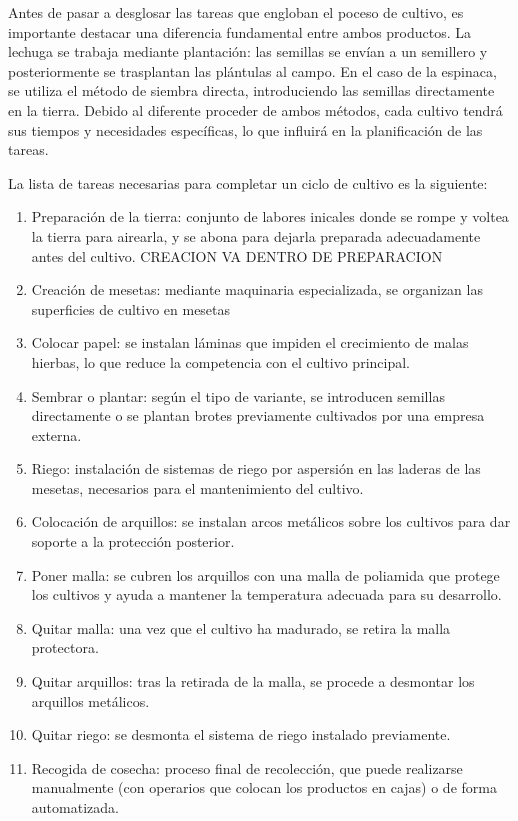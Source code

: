 Antes de pasar a desglosar las tareas que engloban el poceso de cultivo, es importante destacar una diferencia fundamental entre ambos productos.
La lechuga se trabaja mediante plantación: las semillas se envían a un semillero y posteriormente se trasplantan las plántulas al campo. 
En el caso de la espinaca, se utiliza el método de siembra directa, introduciendo las semillas directamente en la tierra.
Debido al diferente proceder de ambos métodos, cada cultivo tendrá sus tiempos y necesidades específicas, lo que influirá en la planificación de las tareas.

La lista de tareas necesarias para completar un ciclo de cultivo es la siguiente:
\begin{enumerate}
    \item Preparación de la tierra: conjunto de labores inicales donde se rompe y voltea la tierra para airearla, y se abona para dejarla preparada adecuadamente antes del cultivo.
    CREACION VA DENTRO DE PREPARACION
    \item Creación de mesetas: mediante maquinaria especializada, se organizan las superficies de cultivo en mesetas 
    \item Colocar papel: se instalan láminas que impiden el crecimiento de malas hierbas, lo que reduce la competencia con el cultivo principal.
    \item Sembrar o plantar: según el tipo de variante, se introducen semillas directamente o se plantan brotes previamente cultivados por una empresa externa.
    \item Riego: instalación de sistemas de riego por aspersión en las laderas de las mesetas, necesarios para el mantenimiento del cultivo.
    \item Colocación de arquillos: se instalan arcos metálicos sobre los cultivos para dar soporte a la protección posterior.
    \item Poner malla: se cubren los arquillos con una malla de poliamida que protege los cultivos y ayuda a mantener la temperatura adecuada para su desarrollo.
    \item Quitar malla: una vez que el cultivo ha madurado, se retira la malla protectora.
    \item Quitar arquillos: tras la retirada de la malla, se procede a desmontar los arquillos metálicos.
    \item Quitar riego: se desmonta el sistema de riego instalado previamente.
    \item Recogida de cosecha: proceso final de recolección, que puede realizarse manualmente (con operarios que colocan los productos en cajas) o de forma automatizada.
\end{enumerate}

